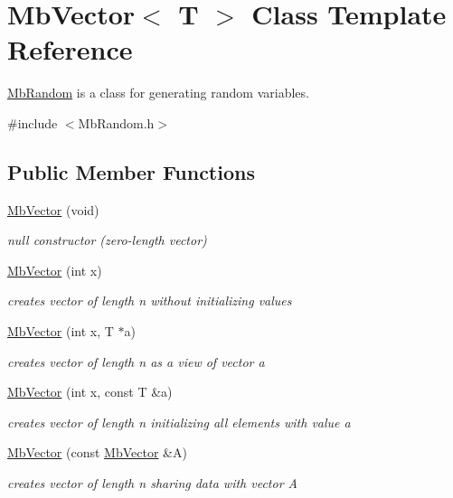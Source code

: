 \hypertarget{class_mb_vector}{}\section{Mb\+Vector$<$ T $>$ Class Template Reference}
\label{class_mb_vector}


\mbox{\hyperlink{class_mb_random}{Mb\+Random}} is a class for generating random variables.  




{\ttfamily \#include $<$Mb\+Random.\+h$>$}

\subsection*{Public Member Functions}
\begin{DoxyCompactItemize}
\item 
\mbox{\hyperlink{class_mb_vector_a34994ea552d4d102c8b1f715deb994dc}{Mb\+Vector}} (void)
\begin{DoxyCompactList}\small\item\em null constructor (zero-\/length vector) \end{DoxyCompactList}\item 
\mbox{\hyperlink{class_mb_vector_a456d0204f259781913d6c628879a2322}{Mb\+Vector}} (int x)
\begin{DoxyCompactList}\small\item\em creates vector of length n without initializing values \end{DoxyCompactList}\item 
\mbox{\hyperlink{class_mb_vector_ac0a3ab84a77f584df145f16d1f873042}{Mb\+Vector}} (int x, T $\ast$a)
\begin{DoxyCompactList}\small\item\em creates vector of length n as a view of vector a \end{DoxyCompactList}\item 
\mbox{\hyperlink{class_mb_vector_a24fc5dce7588ec1fe94c5456c15b4ff1}{Mb\+Vector}} (int x, const T \&a)
\begin{DoxyCompactList}\small\item\em creates vector of length n initializing all elements with value a \end{DoxyCompactList}\item 
\mbox{\hyperlink{class_mb_vector_a9170642bc4f080109660df9eb3f713bc}{Mb\+Vector}} (const \mbox{\hyperlink{class_mb_vector}{Mb\+Vector}} \&A)
\begin{DoxyCompactList}\small\item\em creates vector of length n sharing data with vector A \end{DoxyCompactList}\item 

\end{DoxyCompactItemize}
